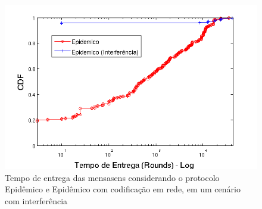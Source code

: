 \begin{figure}[ht]
\centering
\includegraphics[width=.7\textwidth]{img/tempo_epidemico_interferencia.png}
\caption{Tempo de entrega das mensasens considerando o protocolo Epidêmico e Epidêmico com codificação em rede, em um cenário com interferência}
\label{fig:Epidemico_EpidemicoNetCode_interf}
\end{figure} 
